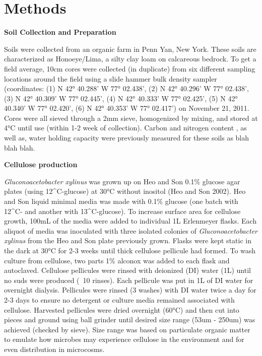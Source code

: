 \section{Methods}


\textbf{Soil Collection and Preparation}



Soils were collected from an organic farm in Penn Yan, New York.  These soils are characterized as Honoeye/Lima, a silty clay loam on calcareous bedrock.  To get a field average, 10cm cores were collected (in duplicate) from six different sampling locations around the field using a slide hammer bulk density sampler (coordinates: (1) N 42° 40.288’ W 77° 02.438’, (2) N 42° 40.296’ W 77° 02.438’, (3) N 42° 40.309’ W 77° 02.445’, (4) N 42° 40.333’ W 77° 02.425’, (5) N 42° 40.340’ W 77° 02.420’, (6) N 42° 40.353’ W 77° 02.417’) on November 21, 2011.   Cores were all sieved through a 2mm sieve, homogenized by mixing, and stored at 4°C until use (within 1-2 week of collection).  Carbon and nitrogen content , as well as, water holding capacity were previously measured for these soils as blah blah blah.     



\textbf{Cellulose production}



\textit{Gluconoacetobacter xylinus} was grown up on Heo and Son 0.1\% glucose agar plates (using 12^{C}-glucose) at 30°C without inositol (Heo and Son 2002).  Heo and Son liquid minimal media was made with 0.1\% glucose (one batch with 12^{C}- and another with 13^{C}-glucose).  To increase surface area for cellulose growth, 100mL of the media were added to individual 1L Erlenmeyer flasks.  Each aliquot of media was inoculated with three isolated colonies of \textit{Gluconoacetobacter xylinus} from the Heo and Son plate previously grown.  Flasks were kept static in the dark at 30°C for 2-3 weeks until thick cellulose pellicule had formed.  To wash culture from cellulose, two parts 1\% alconox was added to each flask and autoclaved.  Cellulose pellicules were rinsed with deionized (DI) water (1L) until no suds were produced (~10 rinses).  Each pellicule was put in 1L of DI water for overnight dialysis.  Pellicules were rinsed (3 washes) with DI water twice a day for 2-3 days to ensure no detergent or culture media remained associated with cellulose.  Harvested pellicules were dried overnight (60°C) and then cut into pieces and ground using ball grinder until desired size range (53um - 250um) was achieved (checked by sieve).  Size range was based on particulate organic matter to emulate how microbes may experience cellulose in the environment and for even distribution in microcosms.                    




